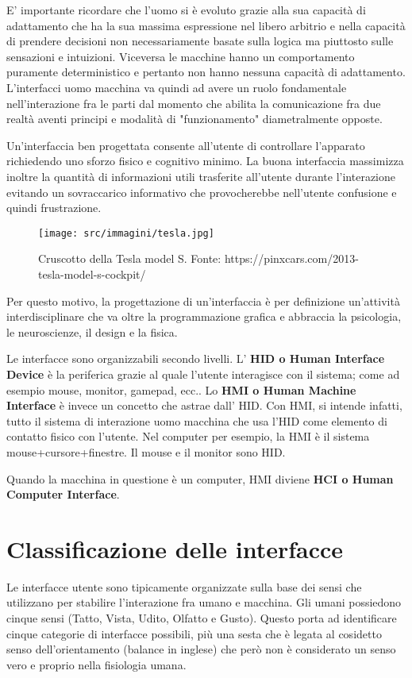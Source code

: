 E' importante ricordare che l'uomo si è evoluto grazie alla sua capacità di adattamento che ha la sua massima espressione nel libero arbitrio e nella capacità di prendere decisioni non necessariamente basate sulla logica ma piuttosto sulle sensazioni e intuizioni. Viceversa le macchine hanno un comportamento puramente deterministico e pertanto non hanno nessuna capacità di adattamento. L'interfacci uomo macchina va quindi ad avere un ruolo fondamentale nell'interazione fra le parti dal momento che abilita la comunicazione fra due realtà aventi principi e modalità di "funzionamento" diametralmente opposte.

Un'interfaccia ben progettata consente all'utente di controllare l'apparato richiedendo uno sforzo fisico e cognitivo minimo. La buona interfaccia massimizza inoltre la quantità di informazioni utili trasferite all'utente durante l'interazione evitando un sovraccarico informativo che provocherebbe nell'utente confusione e quindi frustrazione.

\begin{figure}[!h]
	\centering
	\texttt{[image: src/immagini/tesla.jpg]}
	\caption{Cruscotto della Tesla model S. Fonte: 
https://pinxcars.com/2013-tesla-model-s-cockpit/}
\end{figure}

Per questo motivo, la progettazione di un'interfaccia è per definizione un'attività interdisciplinare che va oltre la programmazione grafica e abbraccia la psicologia, le neuroscienze, il design e la fisica.

Le interfacce sono organizzabili secondo livelli. L' \textbf{HID o Human Interface Device} è la periferica grazie al quale l'utente interagisce con il sistema; come ad esempio mouse, monitor, gamepad, ecc.. Lo \textbf{HMI o Human Machine Interface} è invece un concetto che astrae dall' HID. Con HMI, si intende infatti, tutto il sistema di interazione uomo macchina che usa l'HID come elemento di contatto fisico con l'utente. Nel computer per esempio, la HMI è il sistema mouse+cursore+finestre. Il mouse e il monitor sono HID.

Quando la macchina in questione è un computer, HMI diviene \textbf{HCI o Human Computer Interface}.

\section{Classificazione delle interfacce}
Le interfacce utente sono tipicamente organizzate sulla base dei sensi che utilizzano per stabilire l'interazione fra umano e macchina. Gli umani possiedono cinque sensi (Tatto, Vista, Udito, Olfatto e Gusto). Questo porta ad identificare cinque categorie di interfacce possibili, più una sesta che è legata al cosidetto senso dell'orientamento (balance in inglese) che però non è considerato un senso vero e proprio nella fisiologia umana.

